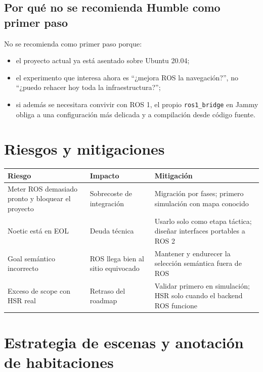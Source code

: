 \documentclass[11pt,a4paper]{article}
\begin{document}
\subsection{Por qué no se recomienda Humble como primer paso}

No se recomienda como primer paso porque:

\begin{itemize}
  \item el proyecto actual ya está asentado sobre Ubuntu 20.04;
  \item el experimento que interesa ahora es ``¿mejora ROS la navegación?'', no
        ``¿puedo rehacer hoy toda la infraestructura?'';
  \item si además se necesitara convivir con ROS 1, el propio \texttt{ros1\_bridge}
        en Jammy obliga a una configuración más delicada y a compilación desde
        código fuente.
\end{itemize}

\section{Riesgos y mitigaciones}

\begin{center}
\begin{tabular}{>{\raggedright\arraybackslash}p{4.2cm} >{\raggedright\arraybackslash}p{5.2cm} >{\raggedright\arraybackslash}p{5.2cm}}
\toprule
\textbf{Riesgo} & \textbf{Impacto} & \textbf{Mitigación} \\
\midrule
Meter ROS demasiado pronto y bloquear el proyecto & Sobrecoste de integración & Migración por fases; primero simulación con mapa conocido \\
\addlinespace
Noetic está en EOL & Deuda técnica & Usarlo solo como etapa táctica; diseñar interfaces portables a ROS 2 \\
\addlinespace
Goal semántico incorrecto & ROS llega bien al sitio equivocado & Mantener y endurecer la selección semántica fuera de ROS \\
\addlinespace
Exceso de scope con HSR real & Retraso del roadmap & Validar primero en simulación; HSR solo cuando el backend ROS funcione \\
\bottomrule
\end{tabular}
\end{center}

\section{Estrategia de escenas y anotación de habitaciones}
\end{document}
